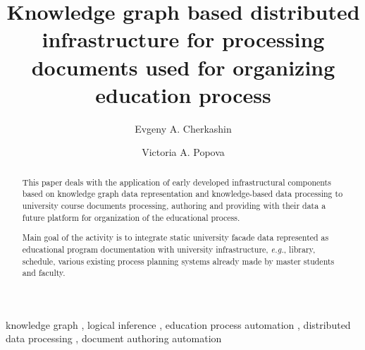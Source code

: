 \documentclass[
]{ceurart}
\newcommand{\email}[1]{\texttt{#1}}
\begin{document}


\title{Knowledge graph based distributed infrastructure for processing documents used for organizing education process}

\author[1,2]{Evgeny A. Cherkashin}
\author[2]{Victoria A. Popova}
\address[1]{Matrosov Institute for System Dynamics and Control Theory SB RAS, Irkutsk, Russia}
\address[2]{Institute of Mathematics and Information Technologies, Irkutsk State University, Irkutsk, Russia\\[0.7em]
\email{eugeneai@icc.ru};\quad\email{victorypopova1@gmail.com}}


\begin{abstract}
  This paper deals with the application of early developed infrastructural components based on knowledge graph data representation and knowledge-based data processing to university course documents processing, authoring and providing with their data a future platform for organization of the educational process.

  Main goal of the activity is to integrate static university facade data represented as educational program documentation with university infrastructure, \emph{e.g.}, library, schedule, various existing process planning systems already made by master students and faculty.
\end{abstract}

\begin{keywords}
  knowledge graph \sep
  logical inference \sep
  education process automation \sep
  distributed data processing \sep
  document authoring automation
\end{keywords}
\end{document}
